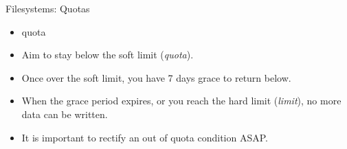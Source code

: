 \begin{frame}[fragile]{Filesystems: Quotas}
\begin{itemize}
\item{quota}
\item<1-|handout:1->{\alert{Aim to stay below the soft limit (\emph{quota}).}}
\item<2-|handout:1->{\alert{Once over the soft limit, you have 7 days grace to return below.}}
\item<3-|handout:2>{\alert{When the grace period expires, or you reach the hard limit (\emph{limit}), no more data can be written.}}
\item<4-|handout:2>{\alert{It is important to rectify an out of quota condition ASAP.}}
\end{itemize}
\end{frame}



